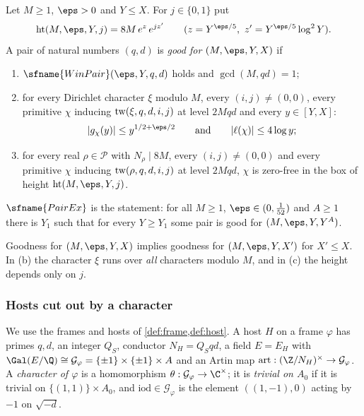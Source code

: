 \begin{definition}\label{pf:top-supply:pairgood}
Let $M\ge1$, $\eps>0$ and $Y\le X$. For $j\in\{0,1\}$ put
\[
\topsupplyht(M,\eps,Y,j)=8M\,e^{z}\,e^{jz'}\qquad(z=Y^{\eps/5},\ z'=Y^{\eps/5}\log^2Y).
\]
A pair of natural numbers $(q,d)$ is \emph{good for $(M,\eps,Y,X)$} if
\begin{enumerate}[label=(\alph*)]
\item $\sfname{WinPair}(\eps,Y,q,d)$ holds and $\gcd(M,qd)=1$;
\item for every Dirichlet character $\xi$ modulo $M$, every $(i,j)\ne(0,0)$, every primitive $\chi$ inducing
$\operatorname{tw}(\xi,q,d,i,j)$ at level $2Mqd$ and every $y\in[Y,X]$:
\[
|g_\chi(y)|\le y^{1/2+\eps/2}\qquad\text{and}\qquad|\ell(\chi)|\le4\log y;
\]
\item for every real $\rho\in\mathcal P$ with $N_\rho\mid8M$, every $(i,j)\ne(0,0)$ and every primitive $\chi$ inducing
$\operatorname{tw}(\rho,q,d,i,j)$ at level $2Mqd$, $\chi$ is zero-free in the box of height $\topsupplyht(M,\eps,Y,j)$.
\end{enumerate}
$\sfname{PairEx}$ is the statement: for all $M\ge1$, $\eps\in(0,\frac1{52})$ and $A\ge1$ there is $Y_1$ such that
for every $Y\ge Y_1$ some pair is good for $(M,\eps,Y,Y^A)$.
  
\end{definition}

Goodness for $(M,\eps,Y,X)$ implies goodness for $(M,\eps,Y,X')$ for $X'\le X$. In (b) the character $\xi$ runs
over \emph{all} characters modulo $M$, and in (c) the height depends only on $j$.

\subsubsection{Hosts cut out by a character}

We use the frames and hosts of \cref{def:frame,def:host}. A host $H$ on a frame $\varphi$ has primes $q,d$, an
integer $Q_S$, conductor $N_H=Q_Sqd$, a field $E=E_H$ with $\Gal(E/\Q)\cong\mathcal G_\varphi=\{\pm1\}\times\{\pm1\}\times A$
and an Artin map $\mathrm{art}:(\Z/N_H)^\times\to\mathcal G_\varphi$. A \emph{character of $\varphi$} is a homomorphism
$\theta:\mathcal G_\varphi\to\C^\times$; it is \emph{trivial on $A_0$} if it is trivial on
$\{(1,1)\}\times A_0$, and $\mathrm{iod}\in\mathcal G_\varphi$ is the element $((1,-1),0)$ acting by $-1$ on
$\sqrt{-d}$.

